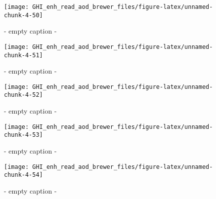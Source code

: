 \documentclass[
  10pt,
  a4paper,oneside]{article}
\begin{document}
\begin{figure}[H]

{\centering \texttt{[image: GHI\_enh\_read\_aod\_brewer\_files/figure-latex/unnamed-chunk-4-50]} 

}

\caption{ - empty caption - }\label{fig:unnamed-chunk-4-50}
\end{figure}
\begin{figure}[H]

{\centering \texttt{[image: GHI\_enh\_read\_aod\_brewer\_files/figure-latex/unnamed-chunk-4-51]} 

}

\caption{ - empty caption - }\label{fig:unnamed-chunk-4-51}
\end{figure}
\begin{figure}[H]

{\centering \texttt{[image: GHI\_enh\_read\_aod\_brewer\_files/figure-latex/unnamed-chunk-4-52]} 

}

\caption{ - empty caption - }\label{fig:unnamed-chunk-4-52}
\end{figure}
\begin{figure}[H]

{\centering \texttt{[image: GHI\_enh\_read\_aod\_brewer\_files/figure-latex/unnamed-chunk-4-53]} 

}

\caption{ - empty caption - }\label{fig:unnamed-chunk-4-53}
\end{figure}
\begin{figure}[H]

{\centering \texttt{[image: GHI\_enh\_read\_aod\_brewer\_files/figure-latex/unnamed-chunk-4-54]} 

}

\caption{ - empty caption - }\label{fig:unnamed-chunk-4-54}
\end{figure}
\end{document}
